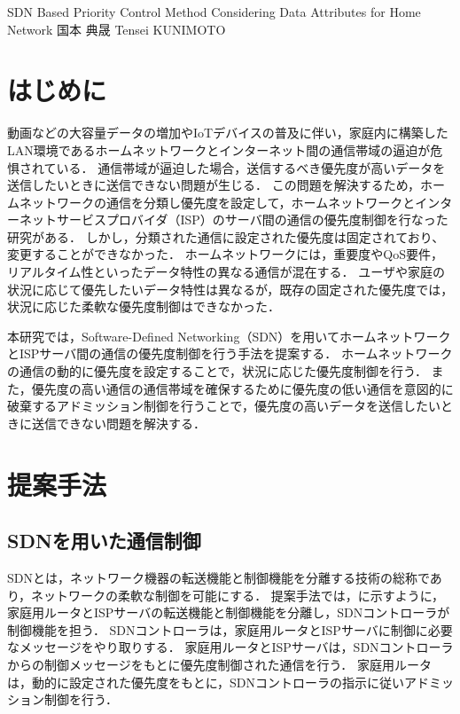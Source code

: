 \documentclass[a4paper,10pt,twocolumn,uplatex]{jsarticle}
\date{19}
\begin{document}
{SDN Based Priority Control Method Considering Data Attributes for Home Network}
{国本 典晟}
{Tensei KUNIMOTO}

\section{はじめに}
動画などの大容量データの増加やIoTデバイスの普及に伴い，家庭内に構築したLAN環境であるホームネットワークとインターネット間の通信帯域の逼迫が危惧されている\cite{ガイドライン}．
通信帯域が逼迫した場合，送信するべき優先度が高いデータを送信したいときに送信できない問題が生じる．
この問題を解決するため，ホームネットワークの通信を分類し優先度を設定して，ホームネットワークとインターネットサービスプロバイダ（ISP）のサーバ間の通信の優先度制御を行なった研究がある\cite{AQRA}．
しかし，分類された通信に設定された優先度は固定されており、変更することができなかった．
ホームネットワークには，重要度やQoS要件，リアルタイム性といったデータ特性の異なる通信が混在する．
ユーザや家庭の状況に応じて優先したいデータ特性は異なるが，既存の固定された優先度では，状況に応じた柔軟な優先度制御はできなかった．\par
本研究では，Software-Defined Networking（SDN）を用いてホームネットワークとISPサーバ間の通信の優先度制御を行う手法を提案する．
ホームネットワークの通信の動的に優先度を設定することで，状況に応じた優先度制御を行う．
また，優先度の高い通信の通信帯域を確保するために優先度の低い通信を意図的に破棄するアドミッション制御を行うことで，優先度の高いデータを送信したいときに送信できない問題を解決する．

\section{提案手法}
\subsection{SDNを用いた通信制御}
SDNとは，ネットワーク機器の転送機能と制御機能を分離する技術の総称であり，ネットワークの柔軟な制御を可能にする．
提案手法では，に示すように，家庭用ルータとISPサーバの転送機能と制御機能を分離し，SDNコントローラが制御機能を担う．
SDNコントローラは，家庭用ルータとISPサーバに制御に必要なメッセージをやり取りする．
家庭用ルータとISPサーバは，SDNコントローラからの制御メッセージをもとに優先度制御された通信を行う．
家庭用ルータは，動的に設定された優先度をもとに，SDNコントローラの指示に従いアドミッション制御を行う．
\end{document}
